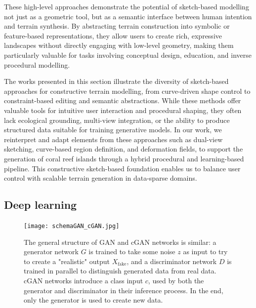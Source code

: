 These high-level approaches demonstrate the potential of sketch-based modelling not just as a geometric tool, but as a semantic interface between human intention and terrain synthesis. By abstracting terrain construction into symbolic or feature-based representations, they allow users to create rich, expressive landscapes without directly engaging with low-level geometry, making them particularly valuable for tasks involving conceptual design, education, and inverse procedural modelling.

\midConclusion

The works presented in this section illustrate the diversity of sketch-based approaches for constructive terrain modelling, from curve-driven shape control to constraint-based editing and semantic abstractions. While these methods offer valuable tools for intuitive user interaction and procedural shaping, they often lack ecological grounding, multi-view integration, or the ability to produce structured data suitable for training generative models. In our work, we reinterpret and adapt elements from these approaches such as dual-view sketching, curve-based region definition, and deformation fields, to support the generation of coral reef islands through a hybrid procedural and learning-based pipeline. This constructive sketch-based foundation enables us to balance user control with scalable terrain generation in data-sparse domains.



\subsection{Deep learning}
\label{sec:coral-island-sota-deep-learning}

\begin{figure}[H]
\centering
\texttt{[image: schemaGAN\_cGAN.jpg]}
\caption{The general structure of GAN and cGAN networks is similar: a generator network $G$ is trained to take some noise $z$ as input to try to create a "realistic" output $X_{\text{fake}}$, and a discriminator network $D$ is trained in parallel to distinguish generated data from real data. cGAN networks introduce a class input $c$, used by both the generator and discriminator in their inference process. In the end, only the generator is used to create new data.}
\label{fig:coral-island-GAN-scheme}
\end{figure}

